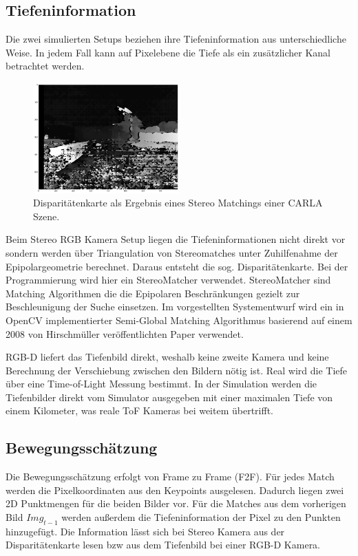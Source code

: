 \subsection{Tiefeninformation}
Die zwei simulierten Setups beziehen ihre Tiefeninformation aus unterschiedliche Weise. In jedem Fall kann auf Pixelebene die Tiefe als ein zusätzlicher Kanal betrachtet werden.
%
\begin{figure}[!ht]
  \begin{center}
    \includegraphics[width=0.5\textwidth]{pictures/disparity_notebook.png}
    \caption[Disparitätenkarte]{Disparitätenkarte als Ergebnis eines Stereo Matchings einer CARLA Szene.}
  \end{center}
\end{figure}
%
Beim Stereo RGB Kamera Setup liegen die Tiefeninformationen nicht direkt vor sondern werden über Triangulation von Stereomatches unter Zuhilfenahme der Epipolargeometrie berechnet.  Daraus entsteht die sog. Disparitätenkarte. Bei der Programmierung wird hier ein StereoMatcher verwendet. StereoMatcher sind Matching Algorithmen die die Epipolaren Beschränkungen gezielt zur Beschleunigung der Suche einsetzen. Im vorgestellten Systementwurf wird ein in OpenCV implementierter Semi-Global Matching Algorithmus basierend auf einem 2008 von Hirschmüller veröffentlichten Paper verwendet. \cite{Hirsch.SGBM}
%

RGB-D liefert das Tiefenbild direkt, weshalb keine zweite Kamera und keine Berechnung der Verschiebung zwischen den Bildern nötig ist. Real wird die Tiefe über eine Time-of-Light Messung bestimmt. In der Simulation werden die Tiefenbilder direkt vom Simulator ausgegeben mit einer maximalen Tiefe von einem Kilometer, was reale ToF Kameras bei weitem übertrifft.

\subsection{Bewegungsschätzung}

Die Bewegungsschätzung erfolgt von Frame zu Frame (F2F). Für jedes Match werden die Pixelkoordinaten aus den Keypoints ausgelesen. Dadurch liegen zwei 2D Punktmengen für die beiden Bilder vor. Für die Matches aus dem vorherigen Bild $Img_{t-1}$ werden au{\ss}erdem die Tiefeninformation der Pixel zu den Punkten hinzugefügt. Die Information lässt sich bei Stereo Kamera aus der Disparitätenkarte lesen bzw aus dem Tiefenbild bei einer RGB-D Kamera.

